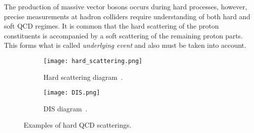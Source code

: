 		The production of massive vector bosons occurs during hard processes, however, precise measurements at hadron colliders require understanding of both hard and soft QCD regimes. It is common that the hard scattering of the proton constituents is accompanied by a soft scattering of the remaining proton parts. This forms what is called \textit{underlying event} and also must be taken into account. 
		    	\begin{figure}[htbp]
			\begin{subfigure}[t]{0.42\textwidth} 
				\texttt{[image: hard\_scattering.png]}
				\caption[Transverse view]{Hard scattering diagram~\cite{hard_interactions}.}
				\label{fig::hs}
			\end{subfigure}
			\begin{subfigure}[t]{0.52\textwidth}
				\texttt{[image: DIS.png]}
				\caption[Side view]{DIS diagram~\cite{proton_struct}.}
				\label{fig::dis}
			\end{subfigure}
			\hfill
			\caption{Examples of hard QCD scatterings.}
			\label{fig::hadron_qcd}
		\end{figure}
